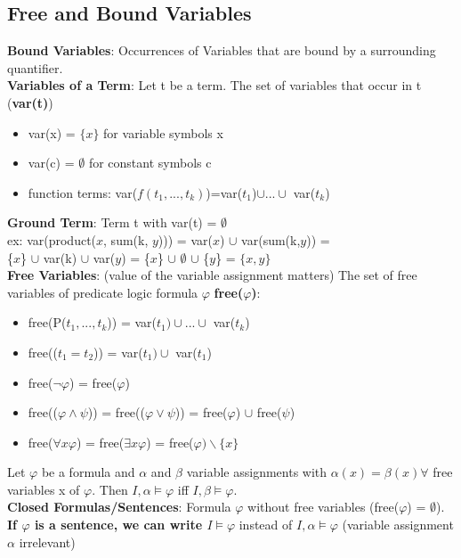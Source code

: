 \subsection*{Free and Bound Variables}
\textbf{Bound Variables}: Occurrences of Variables that are bound by a surrounding quantifier. \\
\textbf{Variables of a Term}: Let t be a term. The set of variables that occur in t (\textbf{var(t)})
\begin{itemize}[noitemsep,topsep=0pt,leftmargin=*]
    \item var(x) = $\{x\}$ for variable symbols x 
    \item var(c) = $\emptyset$ for constant symbols c
    \item function terms: var($f(t_1,...,t_k)$)=var($t_1$)$\cup...\cup$ var($t_k$) %
\end{itemize} 
\textbf{Ground Term}: Term t with var(t) = $\emptyset$ \\
ex: var(product($x$, sum(k, $y$))) = var($x$) $\cup$ var(sum(k,$y$)) = \\ \{$x$\} $\cup$ var(k) $\cup$ var($y$) = \{$x$\} $\cup$ $\emptyset$ $\cup$ \{$y$\} = $\{x,y\}$\\ 
\textbf{Free Variables}: (value of the variable assignment matters) The set of free variables of predicate logic formula $\varphi$ \textbf{free($\varphi$)}: 
\begin{itemize}[noitemsep,topsep=0pt,leftmargin=*]
    \item free(P($t_1,...,t_k$)) = var($t_1) \cup...\cup $ var($t_k$)
    \item free(($t_1 = t_2$)) = var($t_1) \cup$ var($t_1$)
    \item free($\neg \varphi$) = free($\varphi$)
    \item free(($\varphi \wedge \psi$)) = free(($\varphi \vee \psi$)) = free($\varphi$) $\cup$ free($\psi$)
    \item free($\forall x \varphi$) = free($\exists x \varphi$) = free($\varphi) \backslash \{x\}$  
\end{itemize} 
Let $\varphi$ be a formula and $\alpha$ and $\beta$ variable assignments with $\alpha(x) = \beta(x) \forall $ free variables x of $\varphi$. Then $I, \alpha \vDash \varphi$ iff $I, \beta \vDash \varphi$. \\
\textbf{Closed Formulas/Sentences}: Formula $\varphi$ without free variables (free($\varphi$) = $\emptyset$). \textbf{If $\varphi$ is a sentence, we can write $I \vDash \varphi$ }instead of $I, \alpha \vDash \varphi$ (variable assignment $\alpha$ irrelevant) \\ %
